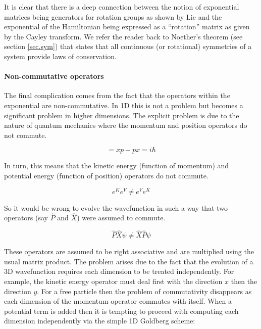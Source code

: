 It is clear that there is a deep connection between the notion of exponential matrices being generators for rotation groups as shown by Lie and the exponential of the Hamiltonian being expressed as a ``rotation'' matrix as given by the Cayley transform. We refer the reader back to Noether's
theorem (see section \ref{sec.sym}) that states that all continuous (or rotational) symmetries of a system provide laws of conservation.

\paragraph{Non-commutative operators}
The final complication comes from the fact that the operators within the exponential are non-commutative. In 1D this is not a problem but becomes a significant problem in higher dimensions. The explicit problem is due to the nature of quantum mechanics where the momentum and position operators do not commute.

\begin{equation}
 [x,p] = xp - px = i\hbar
\end{equation}

\noindent In turn, this means that the kinetic energy (function of momentum) and potential energy (function of position) operators do not commute.

\begin{equation}
e^{K}e^{V}   \ne  e^{V}e^{K} 
\end{equation}

\noindent So it would be wrong to evolve the wavefunction in such a way that two operators (say $\hat{P}$ and $\hat{X}$) were assumed to commute.

\begin{equation}
\hat{P} \hat{X} \psi \ne \hat{X} \hat{P} \psi
\end{equation}

\noindent These operators are assumed to be right associative and are multiplied using the usual matrix product. The problem arises due to the fact that the evolution of a 3D wavefunction requires each dimension to be treated independently. For example, the kinetic energy operator must deal first with the direction $x$ then the direction $y$. For a free particle then the problem of commutativity disappears as each dimension of the momentum operator commutes with itself. When a potential term is added then it is tempting to proceed with computing each dimension independently via the simple 1D Goldberg scheme:

